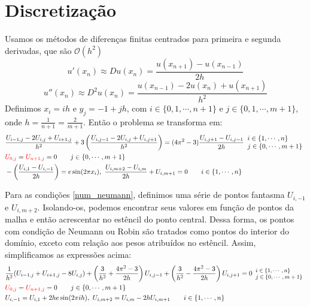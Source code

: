 \documentclass{article}
\begin{document}
    \section{Discretização}
    Usamos os métodos de diferenças finitas centrados para primeira e segunda derivadas, que são $\mathcal{O}(h^2)$
    \[u'(x_n) \approx Du(x_n) = \frac{u(x_{n+1})-u(x_{n-1})}{2h}\]
    \[u''(x_n) \approx D^2u(x_n) = \frac{u(x_{n-1})-2u(x_n)+u(x_{n+1})}{h^2}\]
    Definimos $x_i = ih$ e $y_j = -1 + jh$, com $i \in \{0,1,\cdots,n+1\}$ e $j \in \{0,1,\cdots,m+1\}$, onde $h = \frac{1}{n+1} = \frac{2}{m+1}$. Então o problema se transforma em:
        \begin{align}
        &\frac{U_{i-1,j}-2U_{i,j}+U_{i+1,j}}{h^2} + 3\left(\frac{U_{i,j-1}-2U_{i,j}+U_{i,j+1}}{h^2}\right) = (4\pi^2-3)\frac{U_{i,j+1}-U_{i,j-1}}{2h} \label{num_eq} \begin{array}{l}
            i \in \{1,\cdots,n\}\\
            j \in \{0,\cdots,m+1\}
        \end{array}\\
        &{\color{red}U_{0,j}} = {\color{red}U_{n+1,j}} = 0 \label{num_dirichlet}\qquad j \in \{0,\cdots,m+1\}\\
        &-\left(\frac{U_{i,1}-U_{i,-1}}{2h}\right) = e \sin(2\pi x_i),\ \frac{U_{i,m+2}-U_{i,m}}{2h} + U_{i,m+1} = 0 \label{num_neumann}\qquad i \in \{1,\cdots,n\}
    \end{align}

    Para as condições \ref{num_neumann}, definimos uma série de pontos fantasma $U_{i,-1}$ e $U_{i,m+2}$. Isolando-os, podemos encontrar seus valores em função de pontos da malha e então acrescentar no estêncil do ponto central. Dessa forma, os pontos com condição de Neumann ou Robin são tratados como pontos do interior do domínio, exceto com relação aos pesos atribuídos no estêncil. Assim, simplificamos as expressões acima:
    \begin{align}
        &\frac{1}{h^2}(U_{i-1,j} + U_{i+1,j} - 8 U_{i,j}) + \left(\frac{3}{h^2} + \frac{4\pi^2 -3}{2h}\right)U_{i,j-1} + \left(\frac{3}{h^2} - \frac{4\pi^2 -3}{2h}\right) U_{i,j+1} = 0 \label{simp_eq} \text{\footnotesize $\begin{array}{l}
            i \in \{1,\cdots,n\}\\
            j \in \{0,\cdots,m+1\}
        \end{array}$}\\
        &{\color{red}U_{0,j}} = {\color{red}U_{n+1,j}} = 0 \label{simp_dirichlet}\qquad j \in \{0,\cdots,m+1\}\\
        &U_{i, -1} = U_{i, 1} + 2he\sin(2\pi ih),\ U_{i,m+2} = U_{i,m} - 2h U_{i,m+1} \label{simp_neumann}\qquad i \in \{1,\cdots,n\}
    \end{align}
\end{document}

